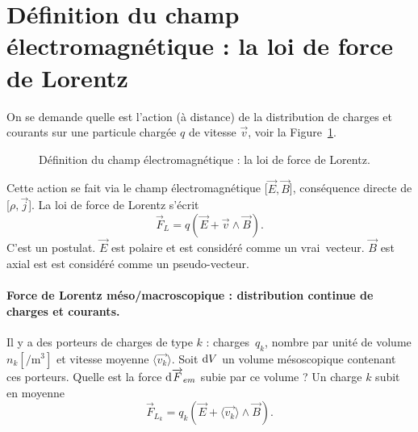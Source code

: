 \section[La loi de force de Lorentz]{Définition du champ électromagnétique : la loi de force de Lorentz}

    On se demande quelle est l'action (à distance) de la distribution de charges et courants sur une particule chargée $q$ de vitesse $\vec{v}$, voir la Figure~\ref{fig:definition_champ_em_loi_force_lorentz}.

    \begin{figure}
        \centering
        \caption{Définition du champ électromagnétique : la loi de force de Lorentz.}    
        \label{fig:definition_champ_em_loi_force_lorentz}
    \end{figure}

    Cette action se fait via le champ électromagnétique [$\vec{E},\vec{B}$], conséquence directe de [$\rho,\vec{j}$]. La loi de force de Lorentz s'écrit
    \begin{equation*}
        \boxed{
            \vec{F}_L = q\left(\vec{E}+\vec{v}\wedge\vec{B}\right).
        }
    \end{equation*}
    C'est un postulat. $\vec{E}$ est polaire et est considéré comme un \og vrai\fg~vecteur. $\vec{B}$ est axial est est considéré comme un \og pseudo-vecteur\fg.

    \paragraph{Force de Lorentz méso/macroscopique : distribution continue de charges et courants.}

        Il y a des porteurs de charges de type $k$ : charges~$q_k$, nombre par unité de volume $n_k [\si{\per\metre\cubed}]$ et vitesse moyenne $\langle\vec{v_k}\rangle$. Soit $\mathrm{d} V$ un volume mésoscopique contenant ces porteurs. Quelle est la force $\mathrm{d}\protect\overrightarrow{{F}}_{em}$ subie par ce volume ? Un charge $k$ subit en moyenne 
        \begin{equation*}
            \vec{F}_{L_k}=q_k\left(\vec{E}+\langle\vec{v_k}\rangle\wedge \vec{B}\right).
        \end{equation*}

